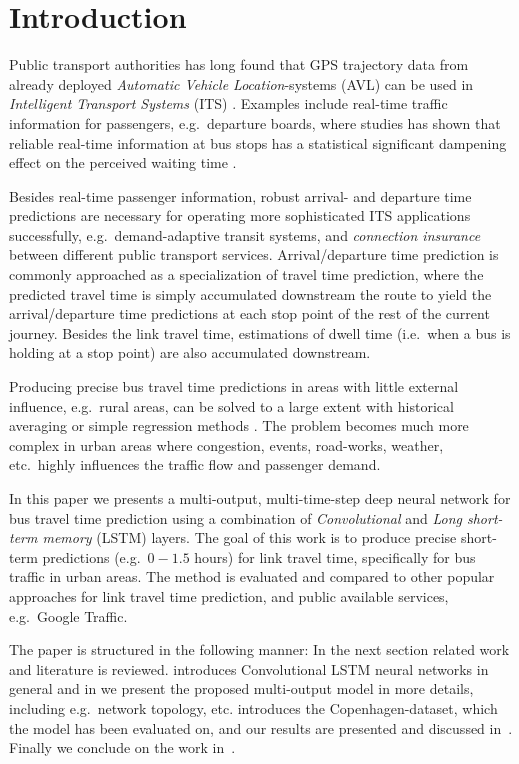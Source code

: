 \documentclass[preprint,11pt,5p,twocolumn]{elsarticle}
\begin{document}
\section{Introduction}
Public transport authorities has long found that GPS trajectory data from already deployed \emph{Automatic Vehicle Location}-systems (AVL) can be used in \emph{Intelligent Transport Systems} (ITS) \cite{Tcrp48}. Examples include real-time traffic information for passengers, e.g.\ departure boards, where studies has shown that reliable real-time information at bus stops has a statistical significant dampening effect on the perceived waiting time \cite{Fan2016}.

Besides real-time passenger information, robust arrival- and departure time predictions are necessary for operating more sophisticated ITS applications successfully, e.g.\ demand-adaptive transit systems, and \emph{connection insurance} between different public transport services. Arrival/departure time prediction is commonly approached as a specialization of travel time prediction, where the predicted travel time is simply accumulated downstream the route to yield the arrival/departure time predictions at each stop point of the rest of the current journey. Besides the link travel time, estimations of dwell time (i.e.\ when a bus is holding at a stop point) are also accumulated downstream.

Producing precise bus travel time predictions in areas with little external influence, e.g.\ rural areas, can be solved to a large extent with historical averaging or simple regression methods \cite{Williams2003,Altinkaya2013}. The problem becomes much more complex in urban areas where congestion, events, road-works, weather, etc.\ highly influences the traffic flow and passenger demand.

In this paper we presents a multi-output, multi-time-step deep neural network for bus travel time prediction using a combination of \emph{Convolutional} and \emph{Long short-term memory} (LSTM) \cite{Lstm1,Lstm2} layers. The goal of this work is to produce precise short-term predictions (e.g.\ $0-1.5$ hours) for link travel time, specifically for bus traffic in urban areas. The method is evaluated and compared to other popular approaches for link travel time prediction, and public available services, e.g.\ Google Traffic.

The paper is structured in the following manner: In the next section related work and literature is reviewed.  introduces Convolutional LSTM neural networks in general and in  we present the proposed multi-output model in more details, including e.g.\ network topology, etc.  introduces the Copenhagen-dataset, which the model has been evaluated on, and our results are presented and discussed in~. Finally we conclude on the work in~.
\end{document}
